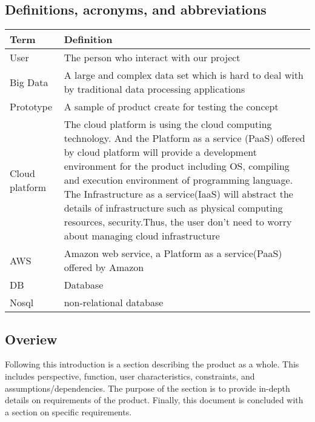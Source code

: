 \documentclass[letterpaper,10pt]{article}
\begin{document}
        \subsection{Definitions, acronyms, and abbreviations} 
        \begin{tabu} to 
        \hline
        Term & Definition \\
        \hline
        User & The person who interact with our project \\
        \hline
        Big Data & A large and complex data set which is hard to deal with by traditional data processing applications\\
        \hline
        Prototype & A sample of product create for testing the concept \\
        \hline
        Cloud platform & The cloud platform is using the cloud computing technology. And the Platform as a service (PaaS) offered by cloud platform will provide a development environment for the product including OS, compiling and  execution environment of programming language. The Infrastructure as a service(IaaS) will abstract the details of infrastructure such as physical computing resources, security.Thus, the user don’t need to worry about managing cloud infrastructure \\
        \hline
        AWS & Amazon web service, a Platform as a service(PaaS) offered by Amazon \\
        \hline
        DB & Database \\
        \hline
        Nosql & non-relational database \\
        \hline
        \end{tabu}
        
     
        \subsection{Overiew}
        Following this introduction is a section describing the product as a whole. This includes perspective, function, user characteristics, constraints, and assumptions/dependencies. The purpose of the section is to provide in-depth details on requirements of the product. Finally, this document is concluded with a section on specific requirements.
\end{document}
